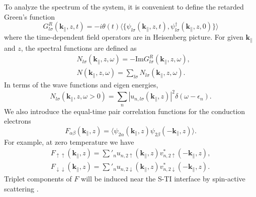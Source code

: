 \documentclass[11pt,revtex,aps]{report}
\newcommand{\kperp}{\mathbf{k}_\parallel}
\begin{document}
To analyze the spectrum of the system, it is convenient to define the retarded Green's function
\begin{equation}
G^R_{l\sigma}(\mathbf{k}_\parallel,z,t)=-i\theta(t)\langle \{\psi_{l\sigma}(\mathbf{k}_\parallel,z,t),
\psi^\dagger_{l\sigma}(\mathbf{k}_\parallel,z,0)\}\rangle
\end{equation}
where the time-dependent field operators are in Heisenberg picture. 
For given $\kperp$ and $z$, the spectral functions 
are defined as
\begin{align}
&N_{l\sigma}(\mathbf{k}_\parallel,z,\omega)= -\mathrm{Im}G^R_{l\sigma}(\mathbf{k}_\parallel,z,\omega), \\
&N(\mathbf{k}_\parallel,z,\omega)=\sum_{l\sigma}N_{l\sigma}(\mathbf{k}_\parallel,z,\omega).
\end{align}
In terms of the wave functions and eigen energies, 
\begin{equation}
N_{l\sigma}(\mathbf{k}_\parallel,z,\omega>0)=\sum_n|u_{n,l\sigma}(\mathbf{k}_\parallel,z)|^2\delta(\omega-\epsilon_n). 
\end{equation}
We also introduce the equal-time pair correlation functions
for the conduction electrons 
\begin{equation}
F_{\alpha\beta}(\mathbf{k}_\parallel,z)=\langle \psi_{2\alpha}(\mathbf{k}_\parallel,z) \psi_{2\beta}(-\mathbf{k}_\parallel,z)\rangle.\label{pair-corr}
\end{equation}
For example, at zero temperature we have
\begin{align}
F_{\uparrow\uparrow}(\mathbf{k}_\parallel,z)=\sum'_n u_{n,2\uparrow}(\mathbf{k}_\parallel,z)
v^*_{n,2\uparrow}(-\mathbf{k}_\parallel,z),\\
F_{\downarrow\downarrow}(\mathbf{k}_\parallel,z)=\sum'_n u_{n,2\downarrow}(\mathbf{k}_\parallel,z)
v^*_{n,2\downarrow}(-\mathbf{k}_\parallel,z).
\end{align}
Triplet components of $F$ will be induced near the S-TI interface by spin-active
scattering \cite{zhao}.

\end{document}

